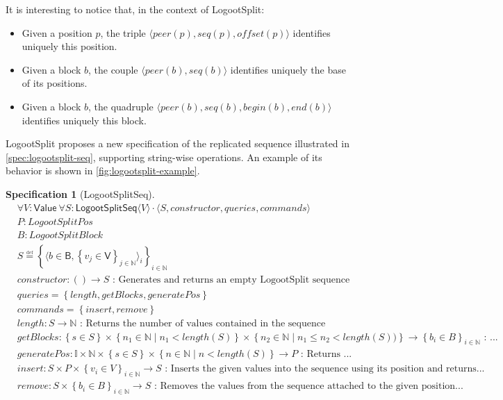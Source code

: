\documentclass{article}
\newcommand{\commands}[1]{commands = \set{#1}}
\newcommand{\defeq}{\overset{\underset{\mathrm{def}}{}}{=}}
\newcommand{\fnspec}[3]{#1: #2 \text{ : #3}}
\newcommand{\inbb}[1]{\in \mathbb{#1}}
\newcommand{\mathlist}[2]{\set{#1_i \in #2}_{i \inbb{N}}}
\newcommand{\queries}[1]{queries = \set{#1}}
\newcommand{\set}[1]{\left\{#1\right\}} %
\newcommand{\spectuple}[1]{\tuple{#1, constructor, queries, commands}}
\newcommand{\ssep}{\mid} %
\newcommand{\tuple}[1]{\langle #1 \rangle}
\theoremstyle{definition}
\theoremstyle{definition}
\theoremstyle{definition}
\newcounter{specificationcounter}
\theoremstyle{definition}
\newtheorem{specification}[specificationcounter]{Specification}
\begin{document}
It is interesting to notice that, in the context of LogootSplit:
\begin{itemize}
    \item Given a position $p$, the triple $\tuple{peer(p), seq(p), offset(p)}$ identifies uniquely this position.
    \item Given a block $b$, the couple $\tuple{peer(b), seq(b)}$ identifies uniquely the base of its positions.
    \item Given a block $b$, the quadruple $\tuple{peer(b), seq(b), begin(b), end(b)}$ identifies uniquely this block.
\end{itemize}

LogootSplit proposes a new specification of the replicated sequence illustrated in \autoref{spec:logootsplit-seq}, supporting string-wise operations. An example of its behavior is shown in \autoref{fig:logootsplit-example}.

\begin{specification}[LogootSplitSeq]
    \begin{align*}
    &\forall V: \mathsf{Value} \ \forall S: \mathsf{LogootSplitSeq} \tuple{V} \cdot \spectuple{S}\\
    &P: LogootSplitPos\\
    &B: LogootSplitBlock\\
    &S \defeq \set{\tuple{b \in \mathsf{B}, \set{v_j \in \mathsf{V}}_{j \inbb {N}}}_i}_{i \inbb{N}}\\
    &\fnspec{constructor}{\left( \right) \to S}{Generates and returns an empty LogootSplit sequence}\\
    &\queries{length, getBlocks, generatePos}\\
    &\commands{insert, remove}\\
    &\fnspec{length}{S \to \mathbb{N}}{Returns the number of values contained in the sequence}\\
    &\fnspec{getBlocks}{\set{s \in S} \times \set{n_1 \inbb{N} \ssep n_1 < length(S)} \times \set{n_2 \inbb{N} \ssep n_1 \leq n_2 < length(S))} \to \mathlist{b}{B}}{...}\\
    &\fnspec{generatePos}{\mathbb{I} \times \mathbb{N} \times \set{s \in S} \times \set{n \inbb{N} \ssep n < length(S)} \to P}{Returns ...}\\
    &\fnspec{insert}{S \times P \times \mathlist{v}{V} \to S}{Inserts the given values into the sequence using its position and returns...}\\
    &\fnspec{remove}{S \times \mathlist{b}{B} \to S}{Removes the values from the sequence attached to the given position...}
    \end{align*}
    \label{spec:logootsplit-seq}
\end{specification}
\end{document}
